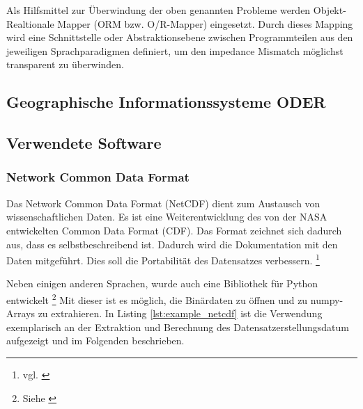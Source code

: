 Als Hilfsmittel zur Überwindung der oben genannten Probleme werden Objekt-Realtionale Mapper (ORM bzw. O/R-Mapper) eingesetzt. Durch dieses Mapping wird eine Schnittstelle oder Abstraktionsebene zwischen Programmteilen aus den jeweiligen Sprachparadigmen definiert, um den impedance Mismatch möglichst transparent zu überwinden.




    

    \subsection{Geographische Informationssysteme  ODER }


    \subsection{Verwendete Software}
    \subsubsection{Network Common Data Format}
    
    Das Network Common Data Format (NetCDF) dient zum Austausch von wissenschaftlichen Daten. Es ist eine Weiterentwicklung des von der NASA entwickelten Common Data Format (CDF). Das Format zeichnet sich dadurch aus, dass es selbstbeschreibend ist. Dadurch wird die Dokumentation mit den Daten mitgeführt. Dies soll die Portabilität des Datensatzes verbessern.  \footnote{vgl. \cite{FisherNetCDF}}
   
    Neben einigen anderen Sprachen, wurde auch eine Bibliothek für Python entwickelt \footnote{Siehe \cite{netCDF4}} Mit dieser ist es möglich, die Binärdaten zu öffnen und zu numpy-Arrays zu extrahieren. In Listing \ref{lst:example_netcdf} ist die Verwendung exemplarisch an der Extraktion und Berechnung des Datensatzerstellungsdatum aufgezeigt und im Folgenden beschrieben.
    
    
